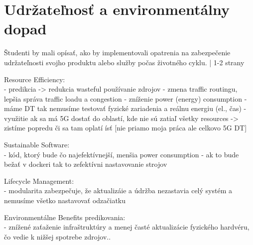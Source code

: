 \section{Udržateľnosť a environmentálny dopad}
\par{
Študenti by mali opísať, ako by implementovali opatrenia na zabezpečenie udržateľnosti svojho produktu alebo služby počas životného cyklu. | 1-2 strany
}
\par{
Resource Efficiency: \\
- predikcia -> redukcia wasteful používanie zdrojov
- zmena traffic routingu, lepšia správa traffic loadu a congestion
- zníženie power (energy) consumption
- máme DT tak nemusíme testovať fyzické zariadenia a reálnu energiu (el., čas) - využitie ak sa má 5G dostať do oblastí, kde nie sú zatiaľ všetky resources -> zistíme popredu či sa tam oplatí ísť [nie priamo moja práca ale celkovo 5G DT]

Sustainable Software:\\
- kód, ktorý bude čo najefektívnejší, menšia power consumption
- ak to bude bežať v dockeri tak to zefektívni nastavovanie strojov

Lifecycle Management: \\
- modularita zabezpečuje, že aktualizáie a údržba nezastavia celý systém a nemusíme všetko nastavovať odzačiatku

Environmentálne Benefits predikovania: \\
-  znížené zaťaženie infraštruktúry a menej časté aktualizácie fyzického hardvéru, čo vedie k nižšej spotrebe zdrojov..}

